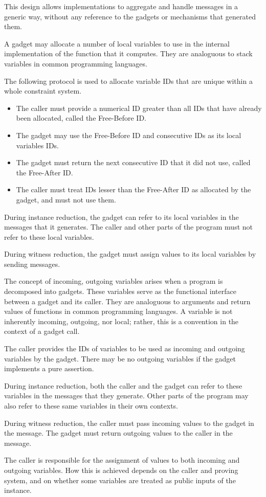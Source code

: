 	This design allows implementations to aggregate and handle messages in a generic way,
	without any	reference to the gadgets or mechanisms that generated them.

	A gadget may allocate a number of local variables to use
	in the internal implementation of the function that it computes.
	They are analoguous to stack variables in common programming languages.

	The following protocol is used to allocate variable IDs that are
	unique within a whole constraint system.
	\begin{itemize}
		\item The caller must provide a numerical ID greater than all IDs that have already been allocated, called the Free-Before ID.
		\item The gadget may use the Free-Before ID and consecutive IDs as its local variables IDs.
		\item The gadget must return the next consecutive ID that it did not use, called the Free-After ID.
		\item The caller must treat IDs lesser than the Free-After ID as allocated by the gadget,
			and must not use them.
	\end{itemize}

	During instance reduction, the gadget can refer to
	its local variables in the\\
	 messages that it generates.
	The caller and other parts of the program must not refer to these local variables.

	During witness reduction, the gadget must assign values to its local variables
	by sending  messages.


	The concept of incoming, outgoing variables arises when a program is decomposed into gadgets.
	These variables serve as the functional interface between a gadget and its caller.
	They are analoguous to arguments and return values of functions in common programming languages.
	A variable is not inherently incoming, outgoing, nor local;
	rather, this is a convention in the context of a gadget call.

	The caller provides the IDs of variables to be used as incoming and outgoing variables by the gadget.
	There may be no outgoing variables if the gadget implements a pure assertion.

	During instance reduction, both the caller and the gadget can refer to
	these variables in the  messages that they generate.
	Other parts of the program may also refer to these same variables in their own contexts.

	During witness reduction, the caller must pass incoming values to the gadget in the  message.
	The gadget must return outgoing values to the caller in the  message.

	The caller is responsible for the assignment of values to both incoming and outgoing variables.
	How this is achieved depends on the caller and proving system,
	and on whether some variables are treated as public inputs of the instance.
